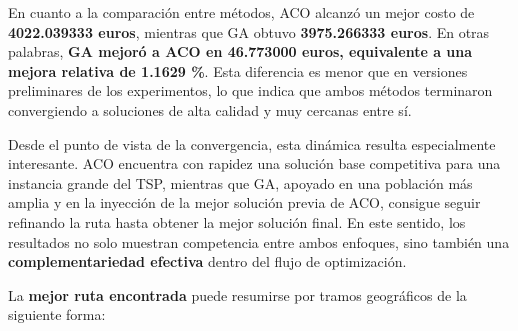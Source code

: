 \documentclass[
  12pt,
  letterpaper,
  DIV=11,
  numbers=noendperiod]{scrartcl}
\begin{document}
En cuanto a la comparación entre métodos, ACO alcanzó un mejor costo de
\textbf{4022.039333 euros}, mientras que GA obtuvo \textbf{3975.266333
euros}. En otras palabras, \textbf{GA mejoró a ACO en 46.773000 euros,
equivalente a una mejora relativa de 1.1629 \%}. Esta diferencia es
menor que en versiones preliminares de los experimentos, lo que indica
que ambos métodos terminaron convergiendo a soluciones de alta calidad y
muy cercanas entre sí.

Desde el punto de vista de la convergencia, esta dinámica resulta
especialmente interesante. ACO encuentra con rapidez una solución base
competitiva para una instancia grande del TSP, mientras que GA, apoyado
en una población más amplia y en la inyección de la mejor solución
previa de ACO, consigue seguir refinando la ruta hasta obtener la mejor
solución final. En este sentido, los resultados no solo muestran
competencia entre ambos enfoques, sino también una
\textbf{complementariedad efectiva} dentro del flujo de optimización.

La \textbf{mejor ruta encontrada} puede resumirse por tramos geográficos
de la siguiente forma:
\end{document}
